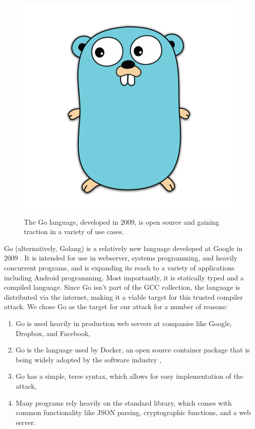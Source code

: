 \documentclass[10pt]{sigplanconf}
\begin{document}
\begin{figure}[H]
\centering
\includegraphics[scale=0.25]{gopher}
\caption{The Go language, developed in 2009, is open source and gaining traction in a variety of use cases.}
\label{fig:gopher}
\end{figure}

Go (alternatively, Golang) is a relatively new language developed at Google in 2009 \cite{golang}. It is intended for use in webserver, systems programming, and heavily concurrent programs, and is expanding its reach to a variety of applications including Android programming. Most importantly, it is statically typed and a compiled language. Since Go isn't part of the GCC collection, the language is distributed via the internet, making it a viable target for this trusted compiler attack. We chose Go as the target for our attack for a number of reasons:
\begin{enumerate}
\item Go is used heavily in production web servers at companies like Google, Dropbox, and Facebook,
\item Go is the language used by Docker, an open source container package that is being widely adopted by the software industry \cite{docker},
\item Go has a simple, terse syntax, which allows for easy implementation of the attack,
\item Many programs rely heavily on the standard library, which comes with common functionality like JSON parsing, cryptographic functions, and a web server.
\end{enumerate}
\end{document}
